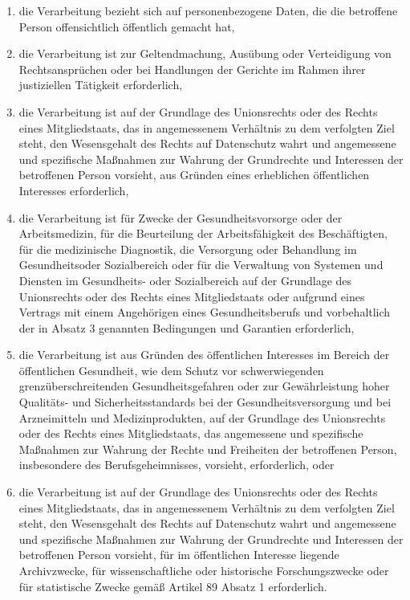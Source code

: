 \documentclass[A4, 12pt]{scrbook}
\begin{document}
\begin{enumerate}
\begin{enumerate}[label=\alph*)]
                    \item die Verarbeitung bezieht sich auf personenbezogene Daten, die die betroffene Person offensichtlich öffentlich gemacht hat,
                    \item die Verarbeitung ist zur Geltendmachung, Ausübung oder Verteidigung von Rechtsansprüchen oder bei Handlungen der Gerichte im Rahmen ihrer justiziellen Tätigkeit erforderlich, 
                    \item die Verarbeitung ist auf der Grundlage des Unionsrechts oder des Rechts eines Mitgliedstaats, das in angemessenem Verhältnis zu dem verfolgten Ziel steht, den Wesensgehalt des Rechts auf Datenschutz wahrt und angemessene und spezifische Maßnahmen zur Wahrung der Grundrechte und Interessen der betroffenen Person vorsieht, aus Gründen eines erheblichen öffentlichen Interesses erforderlich,
                    \item die Verarbeitung ist für Zwecke der Gesundheitsvorsorge oder der Arbeitsmedizin, für die Beurteilung der Arbeitsfähigkeit des Beschäftigten, für die medizinische Diagnostik, die Versorgung oder Behandlung im Gesundheitsoder Sozialbereich oder für die Verwaltung von Systemen und Diensten im Gesundheits- oder Sozialbereich auf der Grundlage des Unionsrechts oder des Rechts eines Mitgliedstaats oder aufgrund eines Vertrags mit einem Angehörigen eines Gesundheitsberufs und vorbehaltlich der in Absatz 3 genannten Bedingungen und Garantien erforderlich,
                    \item die Verarbeitung ist aus Gründen des öffentlichen Interesses im Bereich der öffentlichen Gesundheit, wie dem Schutz vor schwerwiegenden grenzüberschreitenden Gesundheitsgefahren oder zur Gewährleistung hoher Qualitäts- und Sicherheitsstandards bei der Gesundheitsversorgung und bei Arzneimitteln und Medizinprodukten, auf der Grundlage des Unionsrechts oder des Rechts eines Mitgliedstaats, das angemessene und spezifische Maßnahmen zur Wahrung der Rechte und Freiheiten der betroffenen Person, insbesondere des Berufsgeheimnisses, vorsieht, erforderlich, oder
                    \item die Verarbeitung ist auf der Grundlage des Unionsrechts oder des Rechts eines Mitgliedstaats, das in angemessenem Verhältnis zu dem verfolgten Ziel steht, den Wesensgehalt des Rechts auf Datenschutz wahrt und angemessene und spezifische Maßnahmen zur Wahrung der Grundrechte und Interessen der betroffenen Person vorsieht, für im öffentlichen Interesse liegende Archivzwecke, für wissenschaftliche oder historische Forschungszwecke oder für statistische Zwecke gemäß Artikel 89 Absatz 1 erforderlich.

\end{enumerate}
\end{enumerate}
\end{document}
